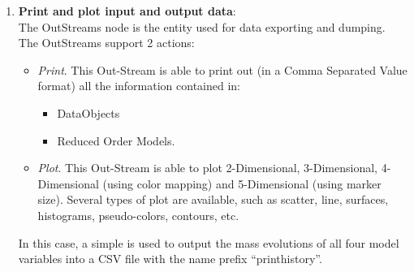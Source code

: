 \begin{enumerate}
    \item \textbf{Print and plot input and output data}: 
      \\ The OutStreams node is the entity used for data exporting and dumping. The OutStreams support
      2 actions:
      \begin{itemize}
       \item \textit{Print}. This Out-Stream is able to print out (in a Comma Separated Value format) all the information
         contained in:
         \begin{itemize}
          \item DataObjects
          \item Reduced Order Models.
         \end{itemize}
       \item \textit{Plot}. This Out-Stream is able to plot 2-Dimensional, 3-Dimensional, 4-Dimensional (using color
       mapping) and 5-Dimensional (using marker size). Several types of plot are available, such as scatter, line, surfaces,
       histograms, pseudo-colors, contours, etc.
      \end{itemize}
      In this case, a simple  is used to output the mass evolutions of all four model variables
      into a CSV file with the name prefix ``print\textunderscore history''.


\end{enumerate}
